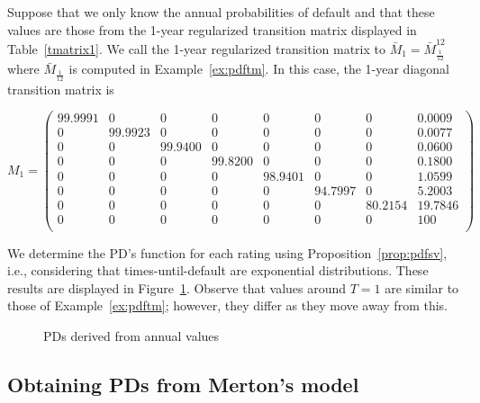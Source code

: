 \documentclass[11pt,fleqn]{book} %
\begin{document}
\begin{example}
	\label{ex:pdfsv}
	Suppose that we only know the annual probabilities of default and that these 
	values are those from the 1-year regularized transition matrix displayed in
	Table~\ref{tmatrix1}. We call the 1-year regularized transition matrix to 
	$\bar{M}_1 = \bar{M}_{\frac{1}{12}}^{12}$ where $\bar{M}_{\frac{1}{12}}$ 
	is computed in Example~\ref{ex:pdftm}. In this case, the 1-year diagonal 
	transition matrix is
	{\small
	\begin{displaymath}
		M_1 = \left(
		\begin{array}{cccccccc}
			99.9991 & 0 & 0 & 0 & 0 & 0 & 0 & 0.0009 \\
			0 & 99.9923 & 0 & 0 & 0 & 0 & 0 & 0.0077 \\
			0 & 0 & 99.9400 & 0 & 0 & 0 & 0 & 0.0600 \\
			0 & 0 & 0 & 99.8200 & 0 & 0 & 0 & 0.1800 \\
			0 & 0 & 0 & 0 & 98.9401 & 0 & 0 & 1.0599 \\
			0 & 0 & 0 & 0 & 0 & 94.7997 & 0 & 5.2003 \\
			0 & 0 & 0 & 0 & 0 & 0 & 80.2154 & 19.7846 \\
			0 & 0 & 0 & 0 & 0 & 0 & 0 & 100 \\
		\end{array}
		\right)
	\end{displaymath}\par}
	We determine the PD's function for each rating using  
	Proposition~\ref{prop:pdfsv}, i.e., considering that times-until-default
	are exponential distributions. These results are displayed in 
	Figure~\ref{fig:pdfsv}. Observe that values around $T=1$ are similar 
	to those of Example~\ref{ex:pdftm}; however, they differ as they move 
	away from this.
\end{example}

\begin{figure}[!ht]
	\centering
	\caption{PDs derived from annual values}
	\label{fig:pdfsv}
\end{figure}

\subsection{Obtaining PDs from Merton's model}
\label{pdfmm}
\end{document}
